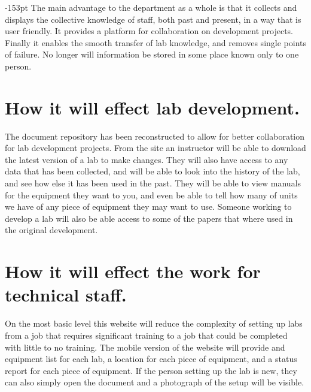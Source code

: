 \begin{adjustwidth}{}{-153pt}
The main advantage to the department as a whole is that it collects and displays the collective knowledge of staff, both past and present, in a way that is user friendly. It provides a platform for collaboration on development projects. Finally it enables the smooth transfer of lab knowledge, and removes single points of failure. No longer will information be stored in some place known only to one person.

\section{\bf How it will effect lab development.}
The document repository has been reconstructed to allow for better collaboration for lab development projects. From the site an instructor will be able to download the latest version of a lab to make changes. They will also have access to any data that has been collected, and will be able to look into the history of the lab, and see how else it has been used in the past. They will be able to view manuals for the equipment they want to you, and even be able to tell how many of units we have of any piece of equipment they may want to use. Someone working to develop a lab will also be able access to some of the papers that where used in the original development.

\section{\bf How it will effect the work for technical staff.}
On the most basic level this website will reduce the complexity of setting up labs from a job that requires significant training to a job that could be completed with little to no training. The mobile version of the website will provide and equipment list for each lab, a location for each piece of equipment, and a status report for each piece of equipment. If the person setting up the lab is new, they can also simply open the document and a photograph of the setup will be visible. 


\AtEndDocument{\clearpage\ifodd\value{page}\else\null\clearpage\fi} %
\end{adjustwidth}


